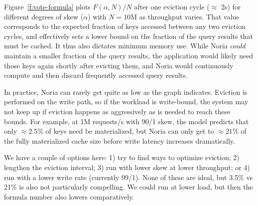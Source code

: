 Figure~\ref{f:vote-formula} plots $F(\alpha, N)/N$ after one eviction cycle
($\approx$ 2s) for different degrees of skew ($\alpha$) with $N=10\text{M}$ as
throughput varies. That value corresponds to the expected fraction of keys
accessed between any two eviction cycles, and effectively sets a lower bound on
the fraction of the query results that must be cached. It thus also dictates
minimum memory use. While Noria \emph{could} maintain a smaller fraction of the
query results, the application would likely need those keys again shortly after
evicting them, and Noria would continuously compute and then discard frequently
accessed query results.

In practice, Noria can rarely get quite as low as the graph indicates. Eviction
is performed on the write path, so if the workload is write-bound, the system
may not keep up if eviction happens as aggressively as is needed to reach these
bounds. For example, at 1M requests/s with 90/1 skew, the model predicts that
only $\approx2.5$\% of keys need be materialized, but Noria can only get to
$\approx21$\% of the fully materialized cache size before write latency
increases dramatically.

\begin{inprogress}
  We have a couple of options here:
    1) try to find ways to optimize eviction;
    2) lengthen the eviction interval;
    3) run with lower skew at lower throughput; or
    4) run with a lower write rate (currently 99/1).
  None of these are ideal, but 3.5\% vs 21\% is also not particularly
  compelling. We could run at lower load, but then the formula number also
  lowers comparatively.
\end{inprogress}
